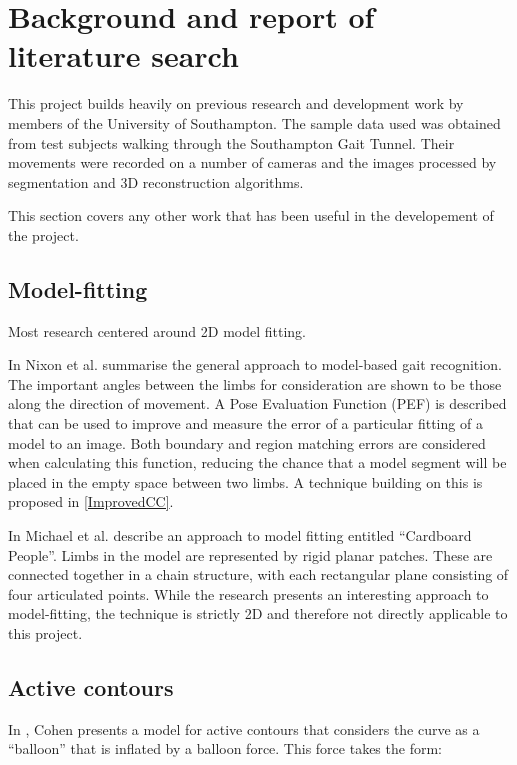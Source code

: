 \section{Background and report of literature search}

This project builds heavily on previous research and development work by members of the University of Southampton.
The sample data used was obtained from test subjects walking through the Southampton Gait Tunnel.
Their movements were recorded on a number of cameras and the images processed by segmentation and 3D reconstruction algorithms.

This section covers any other work that has been useful in the developement of the project.

\subsection{Model-fitting}

Most research centered around 2D model fitting.

In \cite{GaitBook} Nixon et al. summarise the general approach to model-based gait recognition.
The important angles between the limbs for consideration are shown to be those along the direction of movement.
A Pose Evaluation Function (PEF) is described that can be used to improve and measure the error of a particular fitting of a model to an image.
Both boundary and region matching errors are considered when calculating this function, reducing the chance that a model segment will be placed in the empty space between two limbs.
A technique building on this is proposed in \ref{ImprovedCC}.

In \cite{cardboardpeople} Michael et al. describe an approach to model fitting entitled ``Cardboard People''.
Limbs in the model are represented by rigid planar patches.
These are connected together in a chain structure, with each rectangular plane consisting of four articulated points.
While the research presents an interesting approach to model-fitting, the technique is strictly 2D and therefore not directly applicable to this project.

\subsection{Active contours}\label{ContourBackground}

In \cite{CohenBalloons}, Cohen presents a model for active contours that considers the curve as a ``balloon'' that is inflated by a balloon force.
This force takes the form:

